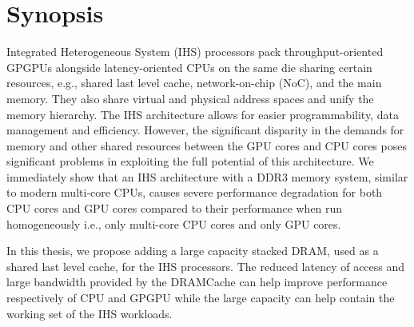 \documentclass[12pt,a4paper]{report}
\begin{document}
\section*{Synopsis}
Integrated Heterogeneous System (IHS) processors pack throughput-oriented GPGPUs alongside latency-oriented CPUs on the same die sharing certain resources, e.g., shared last level cache, network-on-chip (NoC), and the main memory. They also share virtual and physical address spaces and unify the memory hierarchy. The IHS architecture allows for easier programmability, data management and efficiency. However, the significant disparity in the demands for memory and other shared resources between the GPU cores and CPU cores poses significant problems in exploiting the full potential of this architecture. We immediately show that an IHS architecture with a DDR3 memory system, similar to modern multi-core CPUs, causes severe performance degradation for both CPU cores and GPU cores compared to their performance when run homogeneously i.e., only multi-core CPU cores and only GPU cores.
\par In this thesis, we propose adding a large capacity stacked DRAM, used as a shared last level cache, for the IHS processors. The reduced latency of access and large bandwidth provided by the DRAMCache can help improve performance respectively of CPU and GPGPU while the large capacity can help contain the working set of the IHS workloads. 
\end{document}
